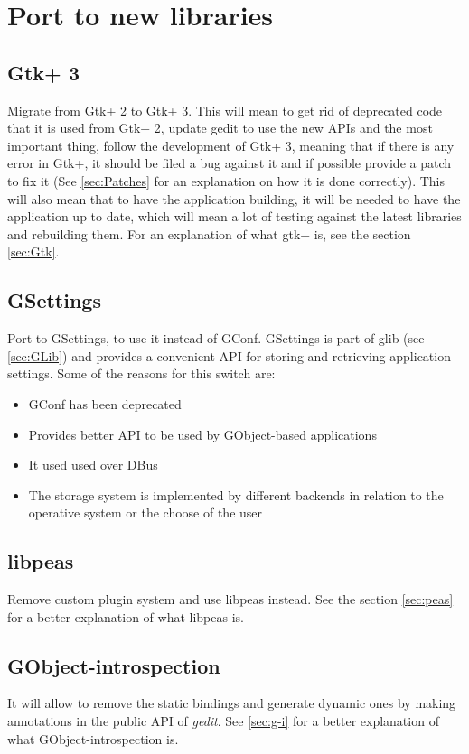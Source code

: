 
\section{Port to new libraries}\label{sec:NewLibraries}

\subsection{Gtk+ 3}\label{sec:Gtk3}

Migrate from Gtk+ 2 to Gtk+ 3. This will mean to get rid of deprecated code that it is used from Gtk+ 2, update gedit to use the new APIs and the most important thing, follow the development of Gtk+ 3, meaning that if there is any error in Gtk+, it should be filed a bug against it and if possible provide a patch to fix it (See \ref{sec:Patches} for an explanation on how it is done correctly). This will also mean that to have the application building, it will be needed to have the application up to date, which will mean a lot of testing against the latest libraries and rebuilding them. For an explanation of what gtk+ is, see the section \ref{sec:Gtk}.

\subsection[GSettings]{GSettings\cite{website:gio}}\label{sec:GSettings}

Port to GSettings, to use it instead of GConf. GSettings is part of glib (see \ref{sec:GLib}) and provides a convenient API for storing and retrieving application settings. Some of the reasons for this switch are:
\begin{itemize}
  \item GConf has been deprecated
  \item Provides better API to be used by GObject-based applications
  \item It used used over DBus
  \item The storage system is implemented by different backends in relation to the operative system or the choose of the user
\end{itemize}

\subsection{libpeas}\label{sec:libpeas}

Remove custom plugin system and use libpeas instead. See the section \ref{sec:peas} for a better explanation of what libpeas is.

\subsection{GObject-introspection}\label{sec:GObjectIntrospection}

It will allow to remove the static bindings and generate dynamic ones by making annotations in the public API of \emph{gedit}. See \ref{sec:g-i} for a better explanation of what GObject-introspection is.
